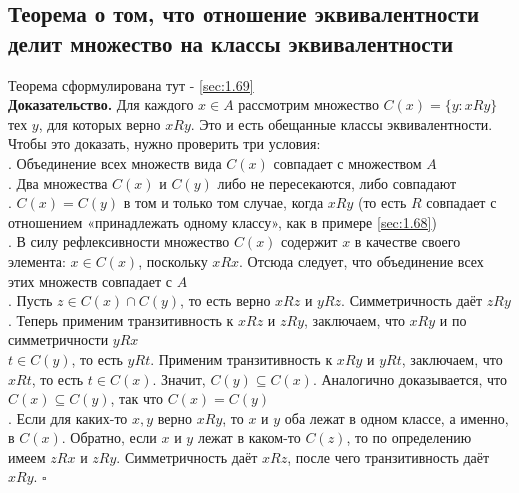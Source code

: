 \documentclass[a4paper]{article}
\newcommand{\qed}{\hfill$\square$}
\begin{document}
\subsection{Теорема о том, что отношение эквивалентности делит множество на классы эквивалентности}
Теорема сформулирована тут - \ref{sec:1.69}\\[2mm]
\textbf{Доказательство.} Для каждого $x \in A$ рассмотрим множество $C(x)=\{y: x R y\}$ тех $y$, для которых верно $x R y$. Это и есть обещанные классы эквивалентности. Чтобы это доказать, нужно проверить три условия:\\[2mm]
. Объединение всех множеств вида $C(x)$ совпадает с множеством $A$\\[2mm]
. Два множества $C(x)$ и $C(y)$ либо не пересекаются, либо совпадают\\[2mm]
. $C(x)=C(y)$ в том и только том случае, когда $x R y$ (то есть $R$ совпадает с отношением «принадлежать одному классу», как в примере \ref{sec:1.68})\\[2mm]
. В силу рефлексивности множество $C(x)$ содержит $x$ в качестве своего элемента: $x \in C(x)$, поскольку $x R x$. Отсюда следует, что объединение всех этих множеств совпадает с $A$\\[2mm]
. Пусть $z \in C(x) \cap C(y)$, то есть верно $x R z$ и $y R z$. Симметричность даёт $z R y$. Теперь применим транзитивность к $x R z$ и $z R y$, заключаем, что $x R y$ и по симметричности $y R x$\\[2mm]
 $t \in C(y)$, то есть $y R t$. Применим транзитивность к $x R y$ и $y R t$, заключаем, что $x R t$, то есть $t \in C(x)$. Значит, $C(y) \subseteq C(x)$. Аналогично доказывается, что $C(x) \subseteq C(y)$, так что $C(x)=C(y)$\\[2mm]
. Если для каких-то $x, y$ верно $x R y$, то $x$ и $y$ оба лежат в одном классе, а именно, в $C(x)$. Обратно, если $x$ и $y$ лежат в каком-то $C(z)$, то по определению имеем $z R x$ и $z R y$. Симметричность даёт $x R z$, после чего транзитивность даёт $x R y$. \qed
\end{document}
